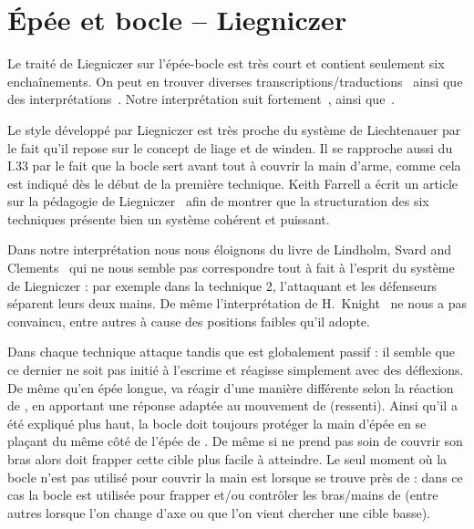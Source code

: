 \chapter{Épée et bocle -- Liegniczer}



Le traité de Liegniczer sur l'épée-bocle est très court et contient seulement six enchaînements.
On peut en trouver diverses transcriptions/traductions~\cite{ardamhe:liegniczer, farrell:liegnieczer, lindholm:ringeck_others:2006} ainsi que des interprétations~\cite{farrell:pedagogy_liegnieczer:2014, youtube:sala_armi:liegniczer, youtube:memag:liegniczer, lindholm:ringeck_others:2006, Myers:LiegniczerBuckler, knight:epee_bocle}.
Notre interprétation suit fortement~\cite{youtube:sala_armi:liegniczer, farrell:pedagogy_liegnieczer:2014}, ainsi que~\cite{youtube:memag:liegniczer}.

Le style développé par Liegniczer est très proche du système de Liechtenauer par le fait qu'il repose sur le concept de liage et de winden.
Il se rapproche aussi du I.33 par le fait que la bocle sert avant tout à couvrir la main d'arme, comme cela est indiqué dès le début de la première technique.
Keith Farrell a écrit un article sur la pédagogie de Liegniczer~\cite{farrell:pedagogy_liegnieczer:2014} afin de montrer que la structuration des six techniques présente bien un système cohérent et puissant.

Dans notre interprétation nous nous éloignons du livre de Lindholm, Svard and Clements~\cite{lindholm:ringeck_others:2006} qui ne nous semble pas correspondre tout à fait à l'esprit du système de Liegniczer : par exemple dans la technique 2, l'attaquant et les défenseurs séparent leurs deux mains.
De même l'interprétation de H.\ Knight~\cite[part I]{knight:epee_bocle} ne nous a pas convaincu, entre autres à cause des positions faibles qu'il adopte.

Dans chaque technique \A attaque tandis que \D est globalement passif : il semble que ce dernier ne soit pas initié à l'escrime et réagisse simplement avec des déflexions.
De même qu'en épée longue, \A va réagir d'une manière différente selon la réaction de \D, en apportant une réponse adaptée au mouvement de \D (ressenti).
Ainsi qu'il a été expliqué plus haut, la bocle doit toujours protéger la main d'épée en se plaçant du même côté de l'épée de \D.
De même si \D ne prend pas soin de couvrir son bras alors \A doit frapper cette cible plus facile à atteindre.
Le seul moment où la bocle n'est pas utilisé pour couvrir la main est lorsque \A se trouve près de \D : dans ce cas la bocle est utilisée pour frapper et/ou contrôler les bras/mains de \D (entre autres lorsque l'on change d'axe ou que l'on vient chercher une cible basse).

